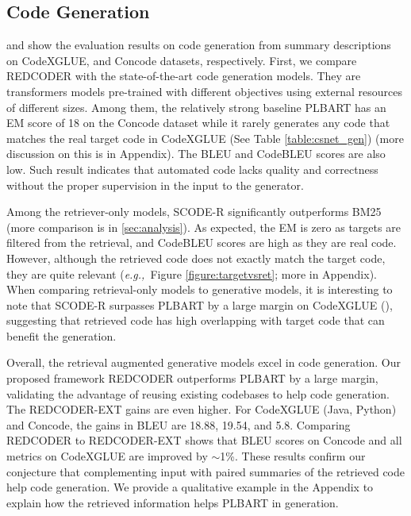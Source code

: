 \documentclass[11pt]{article}
\newcommand{\tool}{{REDCODER}\xspace}
\newcommand{\toolext}{{REDCODER-EXT}\xspace}
\newcommand{\coder}{SCODE-R\xspace}
\newcommand{\eg}{\textit{e.g.,}~}
\begin{document}
    \subsection{Code Generation}
    \label{sec:exp-result-codegen}
    
    \begin{comment}
    1. Compare with retrieval only, and explain why is this improvement?
    2. Compare with generator only and explain why this improvement?
    3. Compare with REDCODER vs REDCODER-ext, and explain why this improvement
    \end{comment} 
     and  show the evaluation results on code generation from summary descriptions on CodeXGLUE, and Concode datasets, respectively. First, we compare \tool with the state-of-the-art code generation models. They are transformers models pre-trained with different objectives using external resources of different sizes. Among them, the relatively strong baseline PLBART has an EM score of 18 on the Concode dataset while it rarely generates any code that matches the real target code in CodeXGLUE (See Table \ref{table:csnet_gen}) (more discussion on this is in Appendix).  The BLEU and CodeBLEU scores are also low. Such result indicates that automated code lacks quality and correctness without the proper supervision in the input to the generator. 
    
    Among the retriever-only models, \coder significantly outperforms BM25 (more comparison is in \cref{sec:analysis}). As expected, the EM is zero as targets are filtered from the retrieval, and CodeBLEU scores are high as they are real code. However, although the retrieved code does not exactly match the target code, they are quite relevant (\eg Figure \ref{figure:targetvsret}; more in Appendix). When comparing retrieval-only models to generative models, it is interesting to note that \coder surpasses PLBART by a large margin on CodeXGLUE (), suggesting that retrieved code has high overlapping with target code that can benefit the generation.
    
    Overall, the retrieval augmented generative models excel in code generation. Our proposed framework \tool outperforms PLBART by a large margin, validating the advantage of reusing existing codebases to help code generation.  The \toolext gains are even higher. For CodeXGLUE (Java, Python) and Concode, the  gains in BLEU are 18.88, 19.54, and 5.8. Comparing \tool to \toolext shows that BLEU scores on Concode and all metrics on CodeXGLUE are improved by $\sim$1\%. These results confirm our conjecture that complementing input with paired summaries of the retrieved code help code generation.  We provide a qualitative example in the Appendix to explain how the retrieved information helps PLBART in generation.
    
\end{document}
